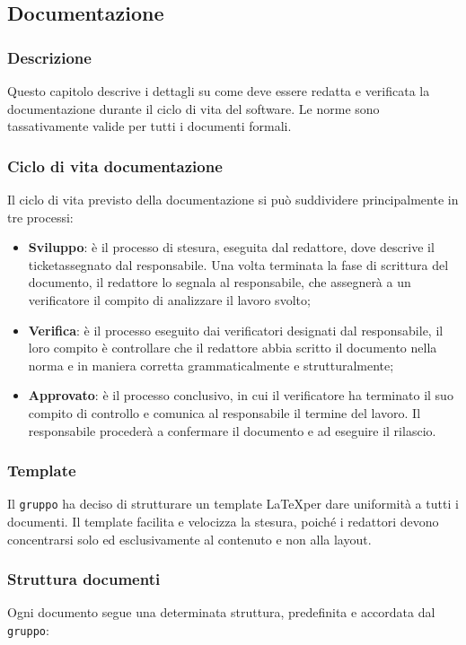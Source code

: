 \subsection{Documentazione}

\subsubsection{Descrizione}
Questo capitolo descrive i dettagli su come deve essere redatta e verificata la documentazione durante il ciclo di vita del software. Le norme sono tassativamente valide per tutti i documenti formali.
\subsubsection{Ciclo di vita documentazione}
Il ciclo di vita previsto della documentazione si può suddividere principalmente in tre processi: 
\begin{itemize}
	\item \textbf{Sviluppo}: è il processo di stesura, eseguita dal redattore, dove descrive il ticket\glossario assegnato dal responsabile. Una volta 	terminata la fase di scrittura del documento, il redattore lo segnala al responsabile, che assegnerà a un verificatore il compito di	analizzare il lavoro svolto;
 	\item \textbf{Verifica}: è il processo eseguito dai verificatori designati dal responsabile, il loro compito è controllare che il redattore abbia scritto il documento nella norma e in maniera corretta grammaticalmente e strutturalmente;
 	\item \textbf{Approvato}: è il processo conclusivo, in cui il verificatore ha terminato il suo compito di controllo e comunica al responsabile il termine del lavoro. Il responsabile procederà a confermare il documento e ad eseguire il rilascio.
\end{itemize} 

\subsubsection{Template}
Il \texttt{gruppo} ha deciso di strutturare un template \LaTeX per dare uniformità a tutti i documenti. Il template facilita e velocizza la stesura, poiché i redattori devono concentrarsi solo ed esclusivamente al contenuto e non alla layout.  

\subsubsection{Struttura documenti}
Ogni documento segue una determinata struttura, predefinita e accordata dal \texttt{gruppo}:


